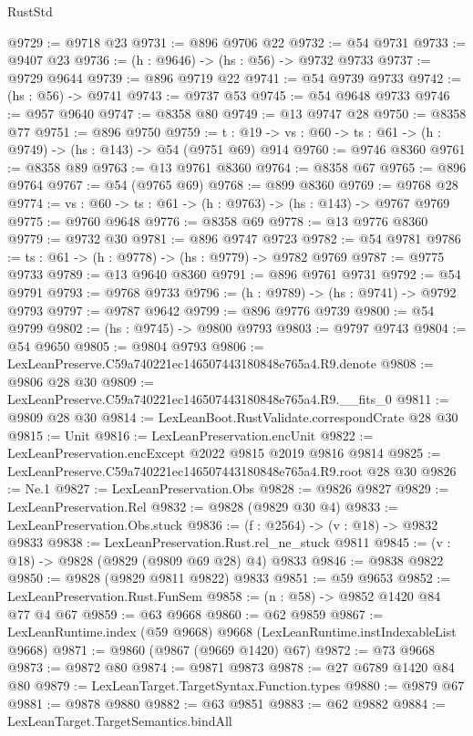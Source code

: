 \begin{lexlean}{RustStd}
\begin{coremodule}
@9729 := @9718 @23
@9731 := @896 @9706 @22
@9732 := @54 @9731
@9733 := @9407 @23
@9736 := (h : @9646) -> (hs : @56) -> @9732 @9733
@9737 := @9729 @9644
@9739 := @896 @9719 @22
@9741 := @54 @9739 @9733
@9742 := (hs : @56) -> @9741
@9743 := @9737 @53
@9745 := @54 @9648 @9733
@9746 := @957 @9640
@9747 := @8358 @80
@9749 := @13 @9747 @28
@9750 := @8358 @77
@9751 := @896 @9750
@9759 := {t : @19} -> {vs : @60} -> {ts : @61} -> (h : @9749) -> (hs : @143) -> @54 (@9751 @69) @914
@9760 := @9746 @8360
@9761 := @8358 @89
@9763 := @13 @9761 @8360
@9764 := @8358 @67
@9765 := @896 @9764
@9767 := @54 (@9765 @69)
@9768 := @899 @8360
@9769 := @9768 @28
@9774 := {vs : @60} -> {ts : @61} -> (h : @9763) -> (hs : @143) -> @9767 @9769
@9775 := @9760 @9648
@9776 := @8358 @69
@9778 := @13 @9776 @8360
@9779 := @9732 @30
@9781 := @896 @9747 @9723
@9782 := @54 @9781
@9786 := {ts : @61} -> (h : @9778) -> (hs : @9779) -> @9782 @9769
@9787 := @9775 @9733
@9789 := @13 @9640 @8360
@9791 := @896 @9761 @9731
@9792 := @54 @9791
@9793 := @9768 @9733
@9796 := (h : @9789) -> (hs : @9741) -> @9792 @9793
@9797 := @9787 @9642
@9799 := @896 @9776 @9739
@9800 := @54 @9799
@9802 := (hs : @9745) -> @9800 @9793
@9803 := @9797 @9743
@9804 := @54 @9650
@9805 := @9804 @9793
@9806 := LexLeanPreserve.C59a740221ec146507443180848e765a4.R9.denote
@9808 := @9806 @28 @30
@9809 := LexLeanPreserve.C59a740221ec146507443180848e765a4.R9.__fits_0
@9811 := @9809 @28 @30
@9814 := LexLeanBoot.RustValidate.correspondCrate @28 @30
@9815 := Unit
@9816 := LexLeanPreservation.encUnit
@9822 := LexLeanPreservation.encExcept @2022 @9815 @2019 @9816 @9814
@9825 := LexLeanPreserve.C59a740221ec146507443180848e765a4.R9.root @28 @30
@9826 := Ne.{1}
@9827 := LexLeanPreservation.Obs
@9828 := @9826 @9827
@9829 := LexLeanPreservation.Rel
@9832 := @9828 (@9829 @30 @4)
@9833 := LexLeanPreservation.Obs.stuck
@9836 := (f : @2564) -> (v : @18) -> @9832 @9833
@9838 := LexLeanPreservation.Rust.rel_ne_stuck @9811
@9845 := (v : @18) -> @9828 (@9829 (@9809 @69 @28) @4) @9833
@9846 := @9838 @9822
@9850 := @9828 (@9829 @9811 @9822) @9833
@9851 := @59 @9653
@9852 := LexLeanPreservation.Rust.FunSem
@9858 := (n : @58) -> @9852 @1420 @84 @77 @4 @67
@9859 := @63 @9668
@9860 := @62 @9859
@9867 := LexLeanRuntime.index (@59 @9668) @9668 (LexLeanRuntime.instIndexableList @9668)
@9871 := @9860 (@9867 (@9669 @1420) @67)
@9872 := @73 @9668
@9873 := @9872 @80
@9874 := @9871 @9873
@9878 := @27 @6789 @1420 @84 @80
@9879 := LexLeanTarget.TargetSyntax.Function.types
@9880 := @9879 @67
@9881 := @9878 @9880
@9882 := @63 @9851
@9883 := @62 @9882
@9884 := LexLeanTarget.TargetSemantics.bindAll

\end{coremodule}
\end{lexlean}
